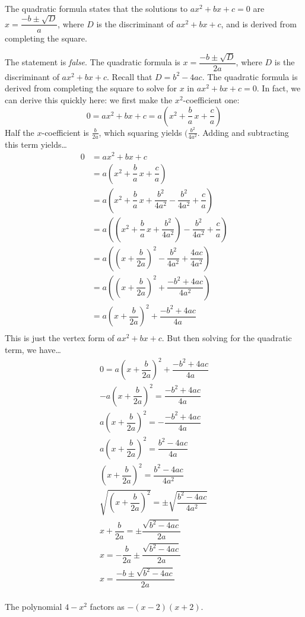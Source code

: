 \documentclass[11pt,letterpaper]{article}
\begin{document}
 The quadratic formula states that the solutions to $ax^2 + bx + c= 0$ are $x= \dfrac{-b \pm \sqrt{D}}{a}$, where $D$ is the discriminant of $ax^2 + bx + c$, and is derived from completing the square. \pspace

\sol The statement is \textit{false}. The quadratic formula is $x= \dfrac{-b \pm \sqrt{D}}{2a}$, where $D$ is the discriminant of $ax^2 + bx + c$. Recall that $D= b^2 - 4ac$. The quadratic formula is derived from completing the square to solve for $x$ in $ax^2 + bx + c= 0$. In fact, we can derive this quickly here: we first make the $x^2$-coefficient one:
	\[
	0= ax^2 + bx + c= a \left(x^2 + \dfrac{b}{a}\,x + \dfrac{c}{a} \right)
	\]
Half the $x$-coefficient is $\frac{b}{2a}$, which squaring yields $(\frac{b^2}{4a^2}$. Adding and subtracting this term yields\dots
	\[
	\begin{aligned}
	0&= ax^2 + bx + c \\
	&= a \left(x^2 + \dfrac{b}{a}\,x + \dfrac{c}{a} \right) \\
	&= a \left(x^2 + \dfrac{b}{a}\,x + \dfrac{b^2}{4a^2} - \dfrac{b^2}{4a^2} + \dfrac{c}{a} \right) \\
	&= a \left( \left(x^2 + \dfrac{b}{a}\,x + \dfrac{b^2}{4a^2} \right) - \dfrac{b^2}{4a^2} + \dfrac{c}{a} \right) \\
	&= a \left( \left(x + \dfrac{b}{2a} \right)^2 - \dfrac{b^2}{4a^2} + \dfrac{4ac}{4a^2} \right) \\
	&= a \left( \left(x + \dfrac{b}{2a} \right)^2 + \dfrac{-b^2 + 4ac}{4a^2} \right) \\
	&= a \left(x + \dfrac{b}{2a} \right)^2 + \dfrac{-b^2 + 4ac}{4a} \\
	\end{aligned}
	\]
This is just the vertex form of $ax^2 + bx + c$. But then solving for the quadratic term, we have\dots
	\[
	\begin{gathered}
	0= a \left(x + \dfrac{b}{2a} \right)^2 + \dfrac{-b^2 + 4ac}{4a} \\
	-a \left(x + \dfrac{b}{2a} \right)^2= \dfrac{-b^2 + 4ac}{4a} \\
	a \left(x + \dfrac{b}{2a} \right)^2= -\dfrac{-b^2 + 4ac}{4a} \\
	a \left(x + \dfrac{b}{2a} \right)^2= \dfrac{b^2 - 4ac}{4a} \\
	\left(x + \dfrac{b}{2a} \right)^2= \dfrac{b^2 - 4ac}{4a^2} \\
	\sqrt{\left(x + \dfrac{b}{2a} \right)^2}= \pm \sqrt{\dfrac{b^2 - 4ac}{4a^2}} \\
	x + \dfrac{b}{2a}= \pm \dfrac{\sqrt{b^2 - 4ac}}{2a} \\
	x= -\dfrac{b}{2a} \pm \dfrac{\sqrt{b^2 - 4ac}}{2a} \\
	x= \dfrac{-b \pm \sqrt{b^2 - 4ac}}{2a} \\
	\end{gathered}
	\]



\newpage



 The polynomial $4 - x^2$ factors as $-(x - 2)(x + 2)$. \pspace

\sol 
\end{document}
